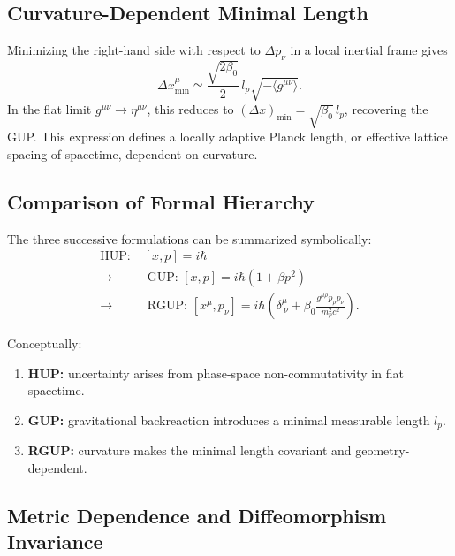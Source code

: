 \documentclass[11pt,oneside]{book}
\numberwithin{equation}{chapter}
\begin{document}
\subsection*{Curvature-Dependent Minimal Length}

Minimizing the right-hand side with respect to $\Delta p_\nu$ in a local inertial frame gives
\begin{equation}
\Delta x_{\min}^{\mu}
\simeq
\frac{\sqrt{2\beta_0}}{2}\,l_p\sqrt{-\langle g^{\mu\nu}\rangle}.
\end{equation}
In the flat limit $g^{\mu\nu}\to\eta^{\mu\nu}$, this reduces to $(\Delta x)_{\min}=\sqrt{\beta_0}\,l_p$, recovering the GUP.  
This expression defines a locally adaptive Planck length, or effective lattice spacing of spacetime, dependent on curvature.

\subsection*{Comparison of Formal Hierarchy}

The three successive formulations can be summarized symbolically:
\begin{align}
\text{HUP:}\;& [x,p] = i\hbar 
\nonumber \\[4pt]
\longrightarrow\;&\;
\text{GUP: } [x,p] = i\hbar(1+\beta p^2)
\nonumber \\[4pt]
\longrightarrow\;&\;
\text{RGUP: } [x^\mu,p_\nu]
 = i\hbar\!\left(
   \delta^\mu_{\ \nu}
   + \beta_0
     \frac{g^{\mu\rho}p_\rho p_\nu}{m_p^2 c^2}
 \right).
\label{eq:HUPtoRGUP}
\end{align}

Conceptually:
\begin{enumerate}
\item \textbf{HUP:} uncertainty arises from phase-space non-commutativity in flat spacetime.  
\item \textbf{GUP:} gravitational backreaction introduces a minimal measurable length $l_p$.  
\item \textbf{RGUP:} curvature makes the minimal length covariant and geometry-dependent.
\end{enumerate}

\subsection*{Metric Dependence and Diffeomorphism Invariance}
\end{document}
